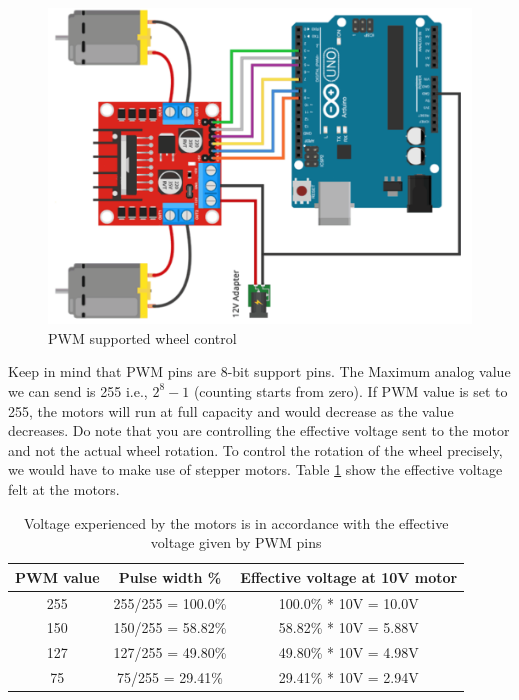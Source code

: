 \begin{figure}
	\centering
	\includegraphics[width=\textwidth]{Images/Motor_Driver/speed_bot.png}
	\caption{PWM supported wheel control}
	\label{fig:speed_controlled}  
\end{figure}

Keep in mind that \ac{PWM} pins are 8-bit support pins. The Maximum analog value we can send is 255 i.e., $ 2^8 - 1 $ (counting starts from zero). If \ac{PWM} value is set to 255, the motors will run at full capacity and would decrease as the value decreases. Do note that you are controlling the effective voltage sent to the motor and not the actual wheel rotation. To control the rotation of the wheel precisely, we would have to make use of stepper motors. Table \ref{fig:motor_volt} show the effective voltage felt at the motors. %


\begin{table}
    \centering
    \renewcommand{\arraystretch}{1.5}
    \begin{tabular}{|c|c|c|}
    \hline
        \textbf{PWM value} & \textbf{Pulse width \%} & \textbf{Effective voltage at 10V motor} \\ \hline
        255 & 255/255 = 100.0\% & 100.0\% * 10V = 10.0V \\ \hline
        150 & 150/255 = 58.82\% & 58.82\% * 10V = 5.88V \\ \hline
        127 & 127/255 = 49.80\% & 49.80\% * 10V = 4.98V \\ \hline
        75 & 75/255 = 29.41\% & 29.41\% * 10V = 2.94V \\ \hline
    \end{tabular}
    \caption[Voltage at motors]{Voltage experienced by the motors is in accordance with the effective voltage given by \ac{PWM} pins}
    \label{fig:motor_volt}
\end{table}
\renewcommand{\arraystretch}{1}

